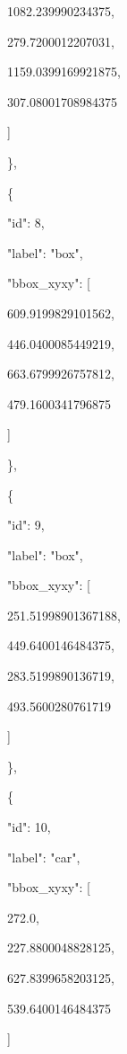 \documentclass[10pt,a4paper]{article}
\begin{document}
        1082.239990234375,\allowbreak{}\par
        279.7200012207031,\allowbreak{}\par
        1159.0399169921875,\allowbreak{}\par
        307.08001708984375\par
      ]\par
    \},\allowbreak{}\par
    \{\par
      "id":\allowbreak{} 8,\allowbreak{}\par
      "label":\allowbreak{} "box",\allowbreak{}\par
      "bbox\_xyxy":\allowbreak{} [\par
        609.9199829101562,\allowbreak{}\par
        446.0400085449219,\allowbreak{}\par
        663.6799926757812,\allowbreak{}\par
        479.1600341796875\par
      ]\par
    \},\allowbreak{}\par
    \{\par
      "id":\allowbreak{} 9,\allowbreak{}\par
      "label":\allowbreak{} "box",\allowbreak{}\par
      "bbox\_xyxy":\allowbreak{} [\par
        251.51998901367188,\allowbreak{}\par
        449.6400146484375,\allowbreak{}\par
        283.5199890136719,\allowbreak{}\par
        493.5600280761719\par
      ]\par
    \},\allowbreak{}\par
    \{\par
      "id":\allowbreak{} 10,\allowbreak{}\par
      "label":\allowbreak{} "car",\allowbreak{}\par
      "bbox\_xyxy":\allowbreak{} [\par
        272.0,\allowbreak{}\par
        227.8800048828125,\allowbreak{}\par
        627.8399658203125,\allowbreak{}\par
        539.6400146484375\par
      ]\par
\end{document}
